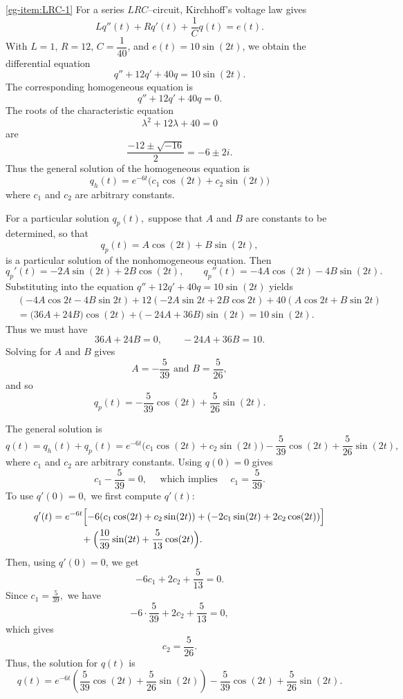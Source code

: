 	
\begin{solution}
	\ref{eg-item:LRC-1} 
	For a series $LRC$–circuit, Kirchhoff's voltage law gives
	\[
	Lq''(t) + Rq'(t) + \frac{1}{C}q(t) = e(t).
	\]
	With $L=1$, $R=12$, $C=\dfrac{1}{40}$, and $e(t)=10\sin(2t)$, we obtain the differential equation
	\[
	q'' + 12q' + 40q = 10\sin(2t).
	\]
	The corresponding homogeneous equation is
	\[
	q'' + 12q' + 40q = 0.
	\]
	The roots of the characteristic equation
	\[
	\lambda^2 + 12\lambda + 40 = 0
	\]
	are
	\[
 \frac{-12 \pm \sqrt{-16}}{2}
	= -6 \pm 2i.
	\]
	Thus the general  solution of the homogeneous equation is
	\[
	q_h(t) = e^{-6t}\bigl(c_1\cos(2t) + c_2\sin(2t)\bigr)
	\]
	where $c_1$ and $c_2$ are arbitrary constants.

For a particular solution $q_p(t),$ suppose that  $A$ and $B$ are constants to be determined, so that
	\[
	q_p(t) = A\cos(2t) + B\sin(2t),
	\] is a particular solution of the nonhomogeneous equation.
	Then
	\[
	q_p'(t) = -2A\sin(2t) + 2B\cos(2t),\qquad
	q_p''(t) = -4A\cos(2t) - 4B\sin(2t).
	\]
	Substituting into the equation $q''+12q'+40q=10\sin(2t)$ yields
	\begin{align*}
		&(-4A\cos 2t - 4B\sin 2t)
		+ 12(-2A\sin 2t + 2B\cos 2t)
		+ 40(A\cos 2t + B\sin 2t) \\
		&= \bigl(36A + 24B\bigr)\cos(2t)
		+ \bigl(-24A + 36B\bigr)\sin(2t)
		= 10\sin(2t).
	\end{align*}
	Thus we must have
	\[
	36A + 24B = 0, \qquad
	-24A + 36B = 10.
	\]
	Solving for $A$ and $B$ gives
	\[A= -\frac{5}{39} \mbox{ and } B = \frac{5}{26},\] and so 
	\[
	q_p(t) = -\frac{5}{39}\cos(2t) + \frac{5}{26}\sin(2t).
	\]
	
	The general solution is
	\[
	q(t) = q_h(t) + q_p(t)
	= e^{-6t}\bigl(c_1\cos(2t) + c_2\sin(2t)\bigr)
	-\frac{5}{39}\cos(2t) + \frac{5}{26}\sin(2t),
	\]
	where $c_1$ and $c_2$ are arbitrary constants.
	Using $q(0)=0$ gives
	\[
	 c_1 - \frac{5}{39} = 0, \quad \mbox{ which implies }\quad 
	c_1 = \frac{5}{39}.
	\]
	To use $q'(0) = 0,$
	we first compute $q'(t)$:
	\[
	\begin{aligned}
		q'(t) 
		&= e^{-6t}\Bigl[-6(c_1\cos(2t) + c_2\sin(2t))
		+(-2c_1\sin(2t) + 2c_2\cos(2t))\Bigr] \\
		&\qquad\quad + \Bigl(\frac{10}{39}\sin(2t) + \frac{5}{13}\cos(2t)\Bigr).
	\end{aligned}
	\]
	Then, using \(q'(0)=0\), we get
	\[
	-6c_1 + 2c_2 + \frac{5}{13}=0.
	\]
Since \(	c_1 = \frac{5}{39},\) we have
	\[
	-6\cdot\frac{5}{39} + 2c_2 + \frac{5}{13} = 0,
	\] which gives
	\[c_2 = \frac{5}{26}.\]
	Thus, the  solution for $q(t)$  is
	\[
		q(t)
		= e^{-6t}\!\left(\frac{5}{39}\cos(2t) + \frac{5}{26}\sin(2t)\right)
		-\frac{5}{39}\cos(2t) + \frac{5}{26}\sin(2t).
	\]
	

\end{solution}
